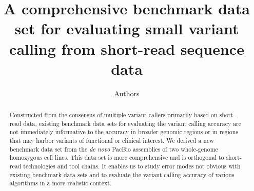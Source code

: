 \documentclass{bioinfo}
\begin{document}

\title[Evaluating small variant calling]{A comprehensive benchmark data set for evaluating small variant calling from short-read sequence data}

\author[Li et al]{Authors}

\address{}

\maketitle

\begin{abstract}

Constructed from the consensus of multiple variant callers primarily based on
short-read data, existing benchmark data sets for evaluating the variant
calling accuracy are not immediately informative to the accuracy in broader
genomic regions or in regions that may harbor variants of functional or
clinical interest. We derived a new benchmark data set from the \emph{de novo}
PacBio assemblies of two whole-genome homozygous cell lines. This data set is
more comprehensive and is orthogonal to short-read technologies and tool
chains. It enables us to study error modes not obvious with existing benchmark
data sets and to evaluate the variant calling accuracy of various algorithms in
a more realistic context.

\end{abstract}
\end{document}
